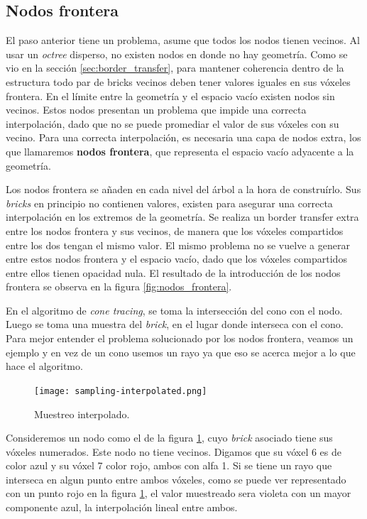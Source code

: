 \subsection{Nodos frontera}

El paso anterior tiene un problema, asume que todos los nodos tienen vecinos.
Al usar un \textit{octree} disperso, no existen nodos en donde no hay geometría.
Como se vio en la sección \ref{sec:border_transfer}, para mantener coherencia dentro de la estructura todo par de bricks vecinos deben tener valores iguales en sus vóxeles frontera.
En el límite entre la geometría y el espacio vacío existen nodos sin vecinos.
Estos nodos presentan un problema que impide una correcta interpolación, dado que no se puede promediar el valor de sus vóxeles con su vecino.
Para una correcta interpolación, es necesaria una capa de nodos extra, los que llamaremos \textbf{nodos frontera}, que representa el espacio vacío adyacente a la geometría.

Los nodos frontera se añaden en cada nivel del árbol a la hora de construírlo.
Sus \textit{bricks} en principio no contienen valores, existen para asegurar una correcta interpolación en los extremos de la geometría.
Se realiza un border transfer extra entre los nodos frontera y sus vecinos, de manera que los vóxeles compartidos entre los dos tengan el mismo valor.
El mismo problema no se vuelve a generar entre estos nodos frontera y el espacio vacío, dado que los vóxeles compartidos entre ellos tienen opacidad nula.
El resultado de la introducción de los nodos frontera se observa en la figura \ref{fig:nodos_frontera}.

En el algoritmo de \textit{cone tracing}, se toma la intersección del cono con el nodo.
Luego se toma una muestra del \textit{brick}, en el lugar donde interseca con el cono.
Para mejor entender el problema solucionado por los nodos frontera, veamos un ejemplo
y en vez de un cono usemos un rayo ya que eso se acerca mejor a lo que hace el algoritmo.

\begin{figure}[h!]
    \centering
    \texttt{[image: sampling-interpolated.png]}
    \caption{Muestreo interpolado.}
    \label{fig:muestreo-interpolado}
\end{figure}

Consideremos un nodo como el de la figura \ref*{fig:muestreo-interpolado}, cuyo \textit{brick} asociado tiene sus vóxeles numerados.
Este nodo no tiene vecinos.
Digamos que su vóxel 6 es de color azul y su vóxel 7 color rojo, ambos con alfa 1.
Si se tiene un rayo que interseca en algun punto entre ambos vóxeles, como se puede ver representado con un punto rojo en la figura \ref{fig:muestreo-interpolado}, el valor muestreado sera violeta con un mayor componente azul, la interpolación lineal entre ambos.

